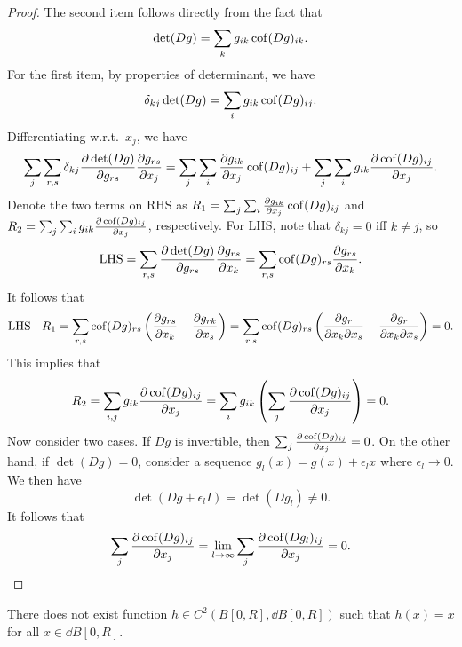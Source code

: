 \documentclass[a4paper]{article}
\begin{document}
\begin{proof}
  The second item follows directly from the fact that
  \[
    \det (Dg)  = \sum_k g_{ik} \operatorname{cof} (Dg)_{ik}.
  \]
  For the first item, by properties of determinant, we have
  \[
    \delta_{kj}  \det (Dg) = \sum_i g_{ik} \operatorname{cof} (Dg)_{ij}.
  \]
  Differentiating w.r.t.\ $x_j$, we have
  \[
    \sum_j \sum_{r, s} \delta_{kj}
    \frac{\partial \det (Dg)}{\partial g_{rs}} \frac{\partial g_{rs}}{\partial x_j}
    = \sum_j \sum_i \frac{\partial g_{ik}}{\partial x_j} \operatorname{cof} (Dg)_{ij}
    + \sum_j \sum_i g_{ik} \frac{\partial \operatorname{cof} (Dg)_{ij}}{\partial x_j}.
  \]
  Denote the two terms on RHS as $R_1 = \sum_j \sum_i \frac{\partial
  g_{ik}}{\partial x_j} \operatorname{cof} (Dg)_{ij}$ and $R_2 = \sum_j \sum_i g_{ik}
  \frac{\partial \operatorname{cof} (Dg)_{ij}}{\partial x_j}$, respectively. For LHS, note that
  $\delta_{kj} = 0$ iff $k \neq j$, so
  \[
    \operatorname{LHS}
    = \sum_{r, s} \frac{\partial \det (Dg)}{\partial g_{rs}} \frac{\partial g_{rs}}{\partial x_k}
    = \sum_{r, s} \operatorname{cof} (Dg)_{rs} \frac{\partial g_{rs}}{\partial x_k}.
  \]
  It follows that
  \[
    \operatorname{LHS} - R_1
    = \sum_{r, s} \operatorname{cof} (Dg)_{rs} \left( \frac{\partial g_{rs}}{\partial x_k}
    -  \frac{\partial g_{rk}}{\partial x_s} \right)
    = \sum_{r, s} \operatorname{cof} (Dg)_{rs} \left( \frac{\partial g_r}{\partial x_k \partial x_s}
    -  \frac{\partial g_r}{\partial x_k \partial x_s} \right)
    = 0.
  \]
  This implies that
  \[
    R_2
    = \sum_{i, j} g_{ik} \frac{\partial \operatorname{cof} (Dg)_{ij}}{\partial x_j}
    = \sum_i g_{ik} \left( \sum_j \frac{\partial \operatorname{cof} (Dg)_{ij}}{\partial x_j} \right)
    = 0.
  \]
  Now consider two cases. If $Dg$ is invertible, then $\sum_j \frac{\partial
  \operatorname{cof} (Dg)_{ij}}{\partial x_j} = 0$. On the other hand, if $\det (Dg) = 0$,
  consider a sequence $g_l(x) = g(x) + \epsilon_l x$ where $\epsilon_l \to
  0$. We then have
  \[
    \det (Dg + \epsilon_l I) = \det (D g_l) \neq 0.
  \]
  It follows that
  \[
    \sum_j \frac{\partial \operatorname{cof} (Dg)_{ij}}{\partial x_j}
    = \lim_{l \to \infty} \sum_j \frac{\partial \operatorname{cof} (D g_l)_{ij}}{\partial x_j}
    = 0.
  \]
\end{proof}

\begin{lemma}[no retractions]
  There does not exist function $h \in C^2 (B[0, R], \dd B[0, R])$
  such that $h(x) = x$ for all $x \in \dd B[0, R]$.
\end{lemma}
\end{document}
